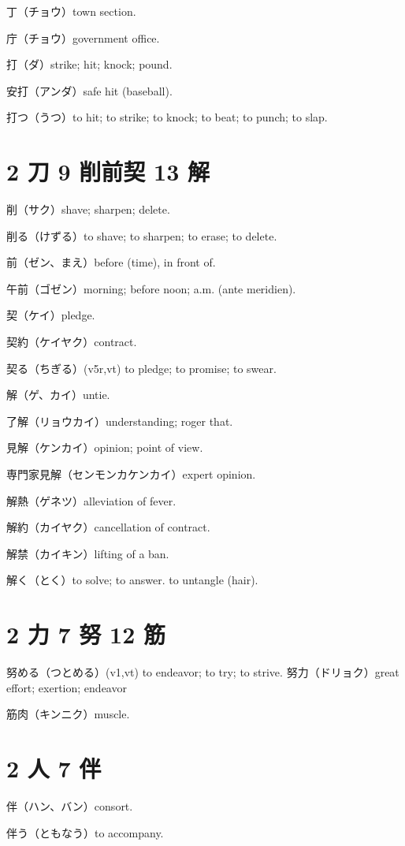 丁（チョウ）town section.

庁（チョウ）government office.

打（ダ）strike; hit; knock; pound.

安打（アンダ）safe hit (baseball).

打つ（うつ）to hit; to strike; to knock; to beat; to punch; to slap.

\section{2 刀 9 削前契 13 解}

削（サク）shave; sharpen; delete.

削る（けずる）to shave; to sharpen; to erase; to delete.

前（ゼン、まえ）before (time), in front of.

午前（ゴゼン）morning; before noon; a.m. (ante meridien).

契（ケイ）pledge.

契約（ケイヤク）contract.

契る（ちぎる）(v5r,vt) to pledge; to promise; to swear.

解（ゲ、カイ）untie.

了解（リョウカイ）understanding; roger that.

見解（ケンカイ）opinion; point of view.

専門家見解（センモンカケンカイ）expert opinion.

解熱（ゲネツ）alleviation of fever.

解約（カイヤク）cancellation of contract.

解禁（カイキン）lifting of a ban.

解く（とく）to solve; to answer. to untangle (hair).

\section{2 力 7 努 12 筋}

努める（つとめる）(v1,vt) to endeavor; to try; to strive.
努力（ドリョク）great effort; exertion; endeavor

筋肉（キンニク）muscle.

\section{2 人 7 伴}

伴（ハン、バン）consort.

伴う（ともなう）to accompany.

